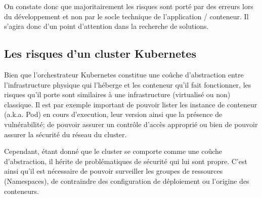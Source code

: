 On constate donc que majoritairement les risques sont porté par des erreurs lors du développement et non par
le socle technique de l'application / conteneur. Il s'agira donc d'un point d'attention dans la recherche de
solutions.

\subsection{Les risques d'un cluster Kubernetes}

Bien que l'orchestrateur Kubernetes constitue une coûche d'abstraction entre l'infrastructure physique qui 
l'héberge et les conteneur qu'il fait fonctionner, les risques qu'il porte sont similaires à une infrastructure
(virtualisé ou non) classique. Il est par exemple important de pouvoir lister les instance de conteneur (a.k.a. 
Pod) en cours d'execution, leur version ainsi que la présence de vulnérabilité; de pouvoir assurer un contrôle
d'accès approprié ou bien de pouvoir assurer la sécurité du réseau du cluster. 

Cependant, étant donné que le cluster se comporte comme une coûche d'abstraction, il hérite de problématiques
de sécurité qui lui sont propre. C'est ainsi qu'il est nécessaire de pouvoir surveiller les groupes de ressources
(Namespaces), de contraindre des configuration de déploiement ou l'origine des conteneurs.

